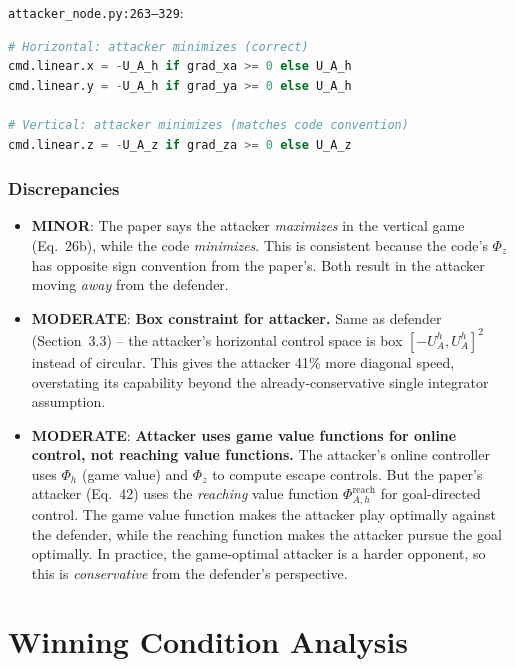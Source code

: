 \documentclass[11pt,a4paper]{article}
\begin{document}
\texttt{attacker\_node.py:263--329}:
\begin{lstlisting}[language=Python]
# Horizontal: attacker minimizes (correct)
cmd.linear.x = -U_A_h if grad_xa >= 0 else U_A_h
cmd.linear.y = -U_A_h if grad_ya >= 0 else U_A_h

# Vertical: attacker minimizes (matches code convention)
cmd.linear.z = -U_A_z if grad_za >= 0 else U_A_z
\end{lstlisting}

\subsubsection{Discrepancies}

\begin{itemize}
\item \textcolor{minblue}{\textbf{MINOR}}: The paper says the attacker \emph{maximizes} in the vertical game (Eq.~26b), while the code \emph{minimizes}. This is consistent because the code's $\Phi_z$ has opposite sign convention from the paper's. Both result in the attacker moving \emph{away} from the defender.

\item \textcolor{modoran}{\textbf{MODERATE}}: \textbf{Box constraint for attacker.} Same as defender (Section~3.3) -- the attacker's horizontal control space is box $[-U^h_A, U^h_A]^2$ instead of circular. This gives the attacker 41\% more diagonal speed, overstating its capability beyond the already-conservative single integrator assumption.

\item \textcolor{modoran}{\textbf{MODERATE}}: \textbf{Attacker uses game value functions for online control, not reaching value functions.} The attacker's online controller uses $\Phi_h$ (game value) and $\Phi_z$ to compute escape controls. But the paper's attacker (Eq.~42) uses the \emph{reaching} value function $\Phi^{\mathrm{reach}}_{A,h}$ for goal-directed control. The game value function makes the attacker play optimally against the defender, while the reaching function makes the attacker pursue the goal optimally. In practice, the game-optimal attacker is a harder opponent, so this is \emph{conservative} from the defender's perspective.
\end{itemize}

\section{Winning Condition Analysis}
\end{document}
